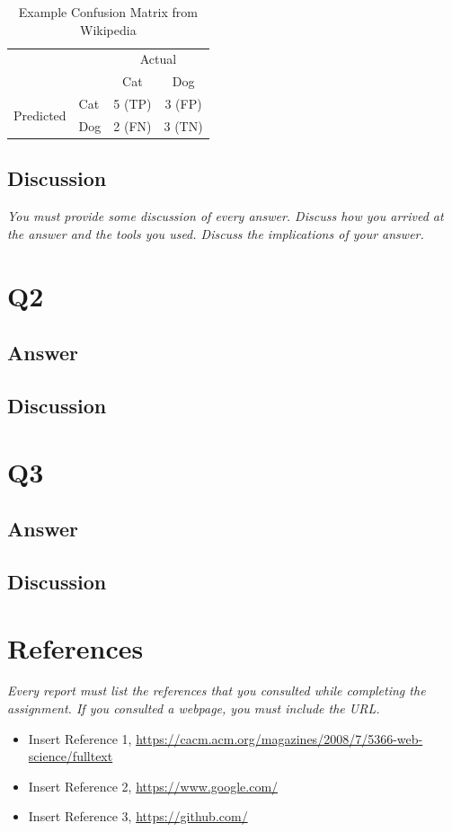 \documentclass[12pt]{article}
\begin{document}
\begin{table}[h]
\centering
\caption{Example Confusion Matrix from Wikipedia}
\label{tbl:confusion}
\begin{tabular}{l|l|c|c|}
\multicolumn{2}{c}{}&\multicolumn{2}{c}{Actual}\\
\cline{3-4}
\multicolumn{2}{c|}{}&Cat&Dog\\
\cline{2-4}
\multirow{2}{*}{Predicted}& Cat & 5 (TP) & 3 (FP)\\
\cline{2-4}
& Dog & 2 (FN) & 3 (TN) \\
\cline{2-4}
\end{tabular}
\end{table}

\subsection*{Discussion}

\emph{You must provide some discussion of every answer. Discuss how you arrived at the answer and the tools you used. Discuss the implications of your answer.}

\section*{Q2}

\subsection*{Answer}

\subsection*{Discussion}


\section*{Q3}

\subsection*{Answer}

\subsection*{Discussion}

\section*{References}

\emph{Every report must list the references that you consulted while completing the assignment. If you consulted a webpage, you must include the URL.}

\begin{itemize}
    \item {Insert Reference 1, \url{https://cacm.acm.org/magazines/2008/7/5366-web-science/fulltext}}
    \item {Insert Reference 2, \url{https://www.google.com/}}
    \item {Insert Reference 3, \url{https://github.com/}}
\end{itemize}
\end{document}
